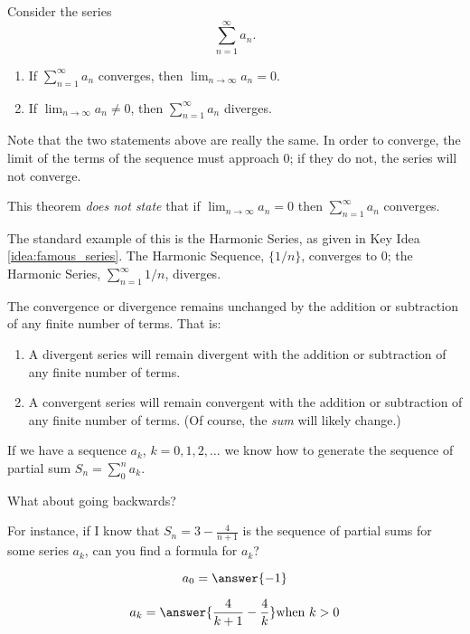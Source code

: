 \documentclass{ximera}
\begin{document}
\begin{theorem}
  Consider the series
  \[
  \sum_{n=1}^\infty a_n.
  \]
\begin{enumerate}
\item If $\sum_{n=1}^\infty a_n$ converges, then $\lim_{n\to\infty}a_n
  =0$.
\item If $\lim_{n\to\infty}a_n \neq 0$, then $\sum_{n=1}^\infty a_n$
  diverges.
\end{enumerate}


Note that the two statements above are really the same. In order to
converge, the limit of the terms of the sequence must approach $0$; if
they do not, the series will not converge.


\begin{warning}
  This theorem \emph{does not state} that if $\lim_{n\to\infty} a_n =
  0$ then $\sum_{n=1}^\infty a_n$ converges.
  
\end{warning}

The standard example of
  this is the Harmonic Series, as given in Key Idea
  \ref{idea:famous_series}. The Harmonic Sequence, $\{1/n\}$,
  converges to 0; the Harmonic Series, $\sum_{n=1}^\infty 1/n$,
  diverges.


{The convergence or divergence remains unchanged by the addition or subtraction of any finite number of terms. That is:
	\begin{enumerate}
	\item		A divergent series will remain divergent with the addition or subtraction of any finite number of terms.
	\item		A convergent series will remain convergent with the addition or subtraction of any finite number of terms. (Of course, the \emph{sum} will likely change.)
	\end{enumerate}
}



\begin{question}
If we have a sequence $a_k$, $k=0,1,2, \dots $ we know how to generate
the sequence of partial sum $S_n = \sum_0^n a_k$.

What about going backwards?

For instance, if I know that $S_n = 3-\frac{4}{n+1}$ is the sequence of partial sums for some series $a_k$, can you find a formula for $a_k$?

\[
a_0 = \answer{-1}
\]

\[
a_k = \answer{\frac{4}{k+1} - \frac{4}{k}} \text{when $k>0$}
\]


\end{question}
\end{theorem}
\end{document}
